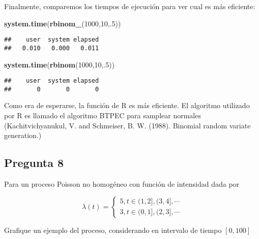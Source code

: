 \documentclass[]{article}
\newenvironment{Shaded}{\begin{snugshade}}{\end{snugshade}}
\newcommand{\DecValTok}[1]{\textcolor[rgb]{0.00,0.00,0.81}{#1}}
\newcommand{\KeywordTok}[1]{\textcolor[rgb]{0.13,0.29,0.53}{\textbf{#1}}}
\newcommand{\NormalTok}[1]{#1}
\begin{document}
Finalmente, comparemos los tiempos de ejecución para ver cual es más
eficiente:

\begin{Shaded}
\begin{Highlighting}[]
\KeywordTok{system.time}\NormalTok{(}\KeywordTok{rbinom_}\NormalTok{(}\DecValTok{1000}\NormalTok{,}\DecValTok{10}\NormalTok{,.}\DecValTok{5}\NormalTok{))}
\end{Highlighting}
\end{Shaded}

\begin{verbatim}
##    user  system elapsed 
##   0.010   0.000   0.011
\end{verbatim}

\begin{Shaded}
\begin{Highlighting}[]
\KeywordTok{system.time}\NormalTok{(}\KeywordTok{rbinom}\NormalTok{(}\DecValTok{1000}\NormalTok{,}\DecValTok{10}\NormalTok{,.}\DecValTok{5}\NormalTok{))}
\end{Highlighting}
\end{Shaded}

\begin{verbatim}
##    user  system elapsed 
##       0       0       0
\end{verbatim}

Como era de esperarse, la función de R es más eficiente. El algoritmo
utilizado por R es llamado el algoritmo BTPEC para samplear normales
(Kachitvichyanukul, V. and Schmeiser, B. W. (1988). Binomial random
variate generation.)

\hypertarget{pregunta-8}{%
\subsection{Pregunta 8}\label{pregunta-8}}

Para un proceso Poisson no homogéneo con función de intensidad dada por

\[
\lambda(t)= 
\begin{cases}
5, t\in(1,2],(3,4], \cdots \\
3, t \in (0,1], (2,3], \cdots 
\end{cases}
\]

Grafique un ejemplo del proceso, considerando en intervalo de tiempo
\([0,100]\)
\end{document}
